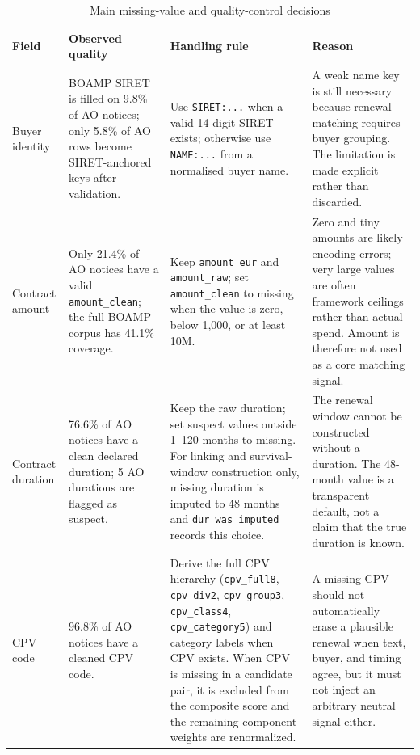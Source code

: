 \documentclass[12pt, a4paper]{article}
\begin{document}
\begin{landscape}
\begin{table}[p]
\centering
\caption{Main missing-value and quality-control decisions}
\label{tab:missing_value_control}
\footnotesize
\begin{tabularx}{\linewidth}{@{}P{3.8cm}P{4.2cm}Y Y@{}}
\toprule
\textbf{Field} & \textbf{Observed quality} & \textbf{Handling rule} & \textbf{Reason} \\
\midrule
Buyer identity & BOAMP SIRET is filled on 9.8\% of AO notices; only 5.8\% of AO rows become SIRET-anchored keys after validation.
& Use \texttt{SIRET:...} when a valid 14-digit SIRET exists; otherwise use \texttt{NAME:...} from a normalised buyer name.
& A weak name key is still necessary because renewal matching requires buyer grouping. The limitation is made explicit rather than discarded. \\[4pt]

Contract amount & Only 21.4\% of AO notices have a valid \texttt{amount\_clean}; the full BOAMP corpus has 41.1\% coverage.
& Keep \texttt{amount\_eur} and \texttt{amount\_raw}; set \texttt{amount\_clean} to missing when the value is zero, below \texteuro{}1,000, or at least \texteuro{}10M.
& Zero and tiny amounts are likely encoding errors; very large values are often framework ceilings rather than actual spend. Amount is therefore not used as a core matching signal. \\[4pt]

Contract duration & 76.6\% of AO notices have a clean declared duration; 5 AO durations are flagged as suspect.
& Keep the raw duration; set suspect values outside 1--120 months to missing. For linking and survival-window construction only, missing duration is imputed to 48 months and \texttt{dur\_was\_imputed} records this choice.
& The renewal window cannot be constructed without a duration. The 48-month value is a transparent default, not a claim that the true duration is known. \\[4pt]

CPV code & 96.8\% of AO notices have a cleaned CPV code.
& Derive the full CPV hierarchy (\texttt{cpv\_full8}, \texttt{cpv\_div2}, \texttt{cpv\_group3}, \texttt{cpv\_class4}, \texttt{cpv\_category5}) and category labels when CPV exists. When CPV is missing in a candidate pair, it is excluded from the composite score and the remaining component weights are renormalized.
& A missing CPV should not automatically erase a plausible renewal when text, buyer, and timing agree, but it must not inject an arbitrary neutral signal either. \\[4pt]


\end{tabularx}
\end{table}
\end{landscape}
\end{document}
